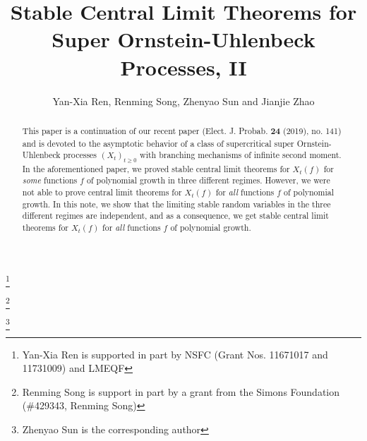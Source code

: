 \documentclass[12pt,a4paper]{amsart}
\theoremstyle{plain}
\theoremstyle{definition}
\numberwithin{equation}{section}
\begin{document}
\title
[stable CLT for super-OU processes, II]
{Stable Central Limit Theorems for Super Ornstein-Uhlenbeck Processes, II}
\author
[Y.-X. Ren, R. Song, Z. Sun and J. Zhao]
{Yan-Xia Ren, Renming Song, Zhenyao Sun and Jianjie Zhao}
\address{
	Yan-Xia Ren \\
	LMAM School of Mathematical Sciences \& Center for Statistical Science \\
  	Peking University \\
  	Beijing 100871, P. R. China}
\thanks{Yan-Xia Ren is supported in part by NSFC (Grant Nos. 11671017  and 11731009) and LMEQF}
\address{
  	Renming Song \\
  	Department of Mathematics \\
  	University of Illinois at Urbana-Champaign \\
  	Urbana, IL 61801, USA}
\thanks{Renming Song is support in part by a grant from the Simons Foundation (\#429343, Renming Song)}
\address{
  	Zhenyao Sun \\
  	School of Mathematics and Statistics\\
  	Wuhan University\\
  	Wuhan, Hubei 430072, P. R. China. }
\address{
  	Faculty of Industrial Engineering and Management\\
  	Technion, Israel Institute of Technology \\
  	Haifa 3200003, Israel}
\thanks{Zhenyao Sun is the corresponding author}
\address{
  	Jianjie Zhao \\
  	School of Mathematical Sciences \\
  	Peking University \\
  	Beijing 100871, P. R. China}

\begin{abstract}
	This paper is a continuation of our recent paper (Elect. J. Probab. \textbf{24} (2019), no. 141) and is devoted to the asymptotic behavior of a class of supercritical super Ornstein-Uhlenbeck processes $(X_t)_{t\geq 0}$ with branching mechanisms of infinite second moment. 
	In the aforementioned paper, we proved stable central limit theorems for  $X_t(f) $ for {\it some} functions $f$ of polynomial growth in three different regimes. 
	However, we were not able to prove central limit theorems for $X_t(f) $ for {\it all} functions $f$ of polynomial growth.
	In this note, we show that the limiting stable random variables in the three different regimes are independent, and as a consequence, we get stable central limit theorems for  $X_t(f) $ for {\it all} functions $f$ of polynomial growth.
\end{abstract}
\maketitle
\end{document}
